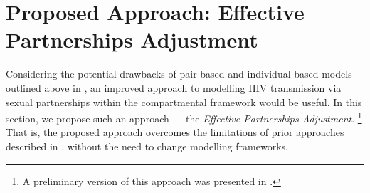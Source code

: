 \section{Proposed Approach: Effective Partnerships Adjustment}\label{foi.prop}
Considering the potential drawbacks of pair-based and individual-based models
outlined above in ,
an improved approach to modelling HIV transmission via sexual partnerships
within the compartmental framework would be useful.
In this section, we propose such an approach
--- the \emph{Effective Partnerships Adjustment}.%
\footnote{A preliminary version of this approach was presented in \cite{Knight2022smdm}.}
That is, the proposed approach
overcomes the limitations of prior approaches described in ,
without the need to change modelling frameworks.
